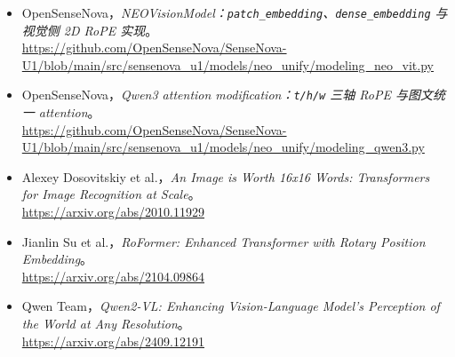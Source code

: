 \begin{itemize}[leftmargin=1.5em]
  \item OpenSenseNova，\emph{NEOVisionModel：\texttt{patch\_embedding}、\texttt{dense\_embedding} 与视觉侧 2D RoPE 实现}。\\
  \url{https://github.com/OpenSenseNova/SenseNova-U1/blob/main/src/sensenova_u1/models/neo_unify/modeling_neo_vit.py}
  \item OpenSenseNova，\emph{Qwen3 attention modification：\texttt{t/h/w} 三轴 RoPE 与图文统一 attention}。\\
  \url{https://github.com/OpenSenseNova/SenseNova-U1/blob/main/src/sensenova_u1/models/neo_unify/modeling_qwen3.py}
  \item Alexey Dosovitskiy et al.，\emph{An Image is Worth 16x16 Words: Transformers for Image Recognition at Scale}。\\
  \url{https://arxiv.org/abs/2010.11929}
  \item Jianlin Su et al.，\emph{RoFormer: Enhanced Transformer with Rotary Position Embedding}。\\
  \url{https://arxiv.org/abs/2104.09864}
  \item Qwen Team，\emph{Qwen2-VL: Enhancing Vision-Language Model's Perception of the World at Any Resolution}。\\
  \url{https://arxiv.org/abs/2409.12191}
\end{itemize}
\endgroup
